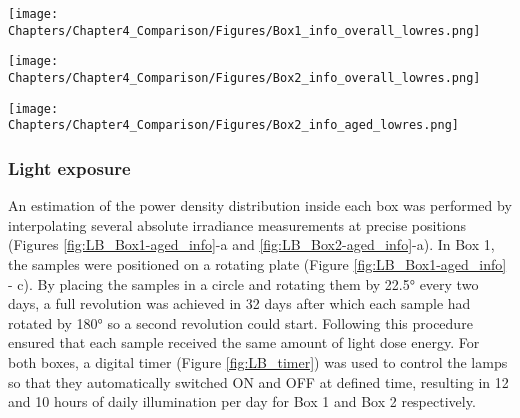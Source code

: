 \begin{figure*}[!h]
\centering
\texttt{[image: Chapters/Chapter4\_Comparison/Figures/Box1\_info\_overall\_lowres.png]}
\caption[\hspace{0.3cm}Photos and dimensions of Box 1]{Photos and dimensions of Box 1: (a) the box covered with a black textile; (b) inside the box (aged and dark areas); (c) graphical representation of the box.}
\label{fig:LB_Box1_info}
\end{figure*}



\begin{figure*}[!h]
\centering
\texttt{[image: Chapters/Chapter4\_Comparison/Figures/Box2\_info\_overall\_lowres.png]}
\caption[\hspace{0.3cm}Photos and dimensions of Box 2]{Photos and dimensions of Box 2: (a) box covered with a black textile; (b) inside the box (aged and dark areas); (c) graphical representation of the box.}
\label{fig:LB_Box2_info}
\end{figure*}



\begin{figure*}[!h]
\centering
\texttt{[image: Chapters/Chapter4\_Comparison/Figures/Box2\_info\_aged\_lowres.png]}
\caption[\hspace{0.3cm}Description of the illuminated area of Box 2]{Description of the illuminated area of Box 2: (a) irradiance mapping; (b) position of the samples and other elements; (c) photograph.}
\label{fig:LB_Box2-aged_info}
\end{figure*}


\subsubsection{Light exposure}


An estimation of the power density distribution inside each box was performed by interpolating several absolute irradiance measurements at precise positions (Figures \ref{fig:LB_Box1-aged_info}-a and \ref{fig:LB_Box2-aged_info}-a). In Box 1, the samples were positioned on a rotating plate (Figure \ref{fig:LB_Box1-aged_info} - c). By placing the samples in a circle and rotating them by \ang{22.5} every two days, a full revolution was achieved in 32 days after which each sample had rotated by \ang{180} so a second revolution could start. Following this procedure ensured that each sample received the same amount of light dose energy. For both boxes, a digital timer (Figure \ref{fig:LB_timer}) was used to control the lamps so that they automatically switched ON and OFF at defined time, resulting in 12 and 10 hours of daily illumination per day for Box 1 and Box 2 respectively.\\

